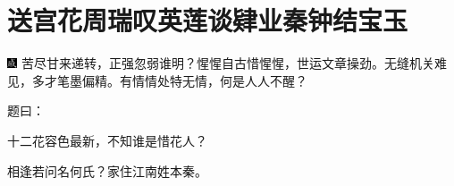 

\chapter{送宫花周瑞叹英莲\hspace{.5em}谈肄业秦钟结宝玉}

{\includegraphics[width=3mm]{../Images/00005}  \kaishu 苦尽甘来递转，正强忽弱谁明？惺惺自古惜惺惺，世运文章操劲。无缝机关难见，多才笔墨偏精。有情情处特无情，何是人人不醒？}

题曰：

十二花容色最新，不知谁是惜花人？

相逢若问名何氏？家住江南姓本秦。

